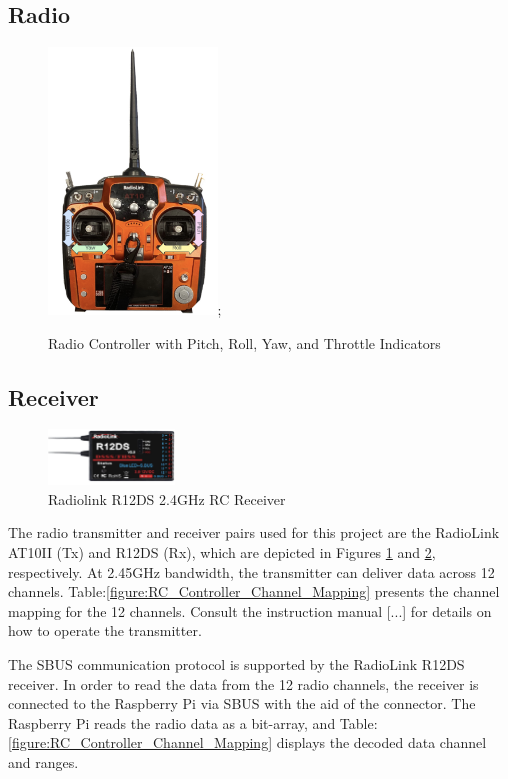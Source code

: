 \documentclass{article}
\begin{document}
\subsection{Radio}\label{radio}
\begin{figure}[H]
  \centering
  \includegraphics[width=0.4\textwidth]{Pictures/radio.jpg};
  \caption{Radio Controller with Pitch, Roll, Yaw, and Throttle Indicators}
  \label{fig:radio_controller}
\end{figure}
\subsection{Receiver}
\begin{figure}[H]
  \centering
  \includegraphics[width=0.3\textwidth]{Pictures/reciever.png}
  \caption{Radiolink R12DS 2.4GHz RC Receiver}
  \label{fig:receiver}
\end{figure}
The radio transmitter and receiver pairs used for this project are the RadioLink
AT10II (Tx) and R12DS (Rx), which are depicted in Figures
\ref{fig:radio_controller} and \ref{fig:receiver}, respectively. At 2.45GHz
bandwidth, the transmitter can deliver data across 12 channels.
Table:\ref{figure:RC_Controller_Channel_Mapping} presents the channel mapping
for the 12 channels. Consult the instruction manual [...] for details on how to
operate the transmitter.

The SBUS communication protocol is supported by the RadioLink R12DS receiver. In
order to read the data from the 12 radio channels, the receiver is connected to
the Raspberry Pi via SBUS with the aid of the connector. The Raspberry Pi reads
the radio data as a bit-array, and
Table:\ref{figure:RC_Controller_Channel_Mapping} displays the decoded data
channel and ranges.
\end{document}
